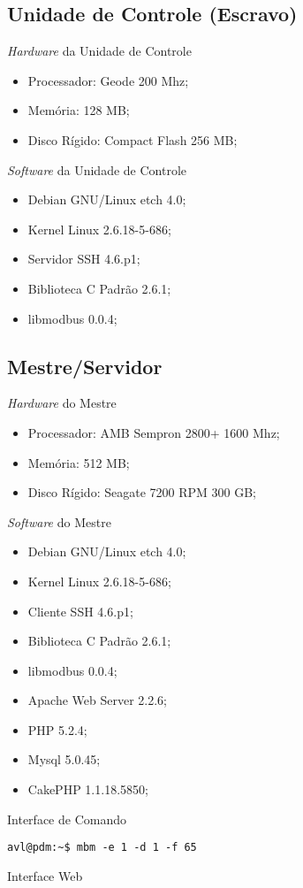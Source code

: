 \subsection{Unidade de Controle (Escravo)}
\begin{frame}{\textit{Hardware} da Unidade de Controle}
\begin{itemize}
\item Processador: Geode 200 Mhz;
\item Memória: 128 MB;
\item Disco Rígido: Compact Flash 256 MB;
\end{itemize}
\end{frame}

\begin{frame}{\textit{Software} da Unidade de Controle}
\begin{itemize}
\item Debian GNU/Linux etch 4.0;
\item Kernel Linux 2.6.18-5-686;
\item Servidor SSH 4.6.p1;
\item Biblioteca C Padrão 2.6.1;
\item libmodbus 0.0.4;
\end{itemize}
\end{frame}

\subsection{Mestre/Servidor}
\begin{frame}{\textit{Hardware} do Mestre}
\begin{itemize}
\item Processador: AMB Sempron 2800+ 1600 Mhz;
\item Memória: 512 MB;
\item Disco Rígido: Seagate 7200 RPM 300 GB;
\end{itemize}
\end{frame}

\begin{frame}{\textit{Software} do Mestre}
\begin{itemize}
\item Debian GNU/Linux etch 4.0;
\item Kernel Linux 2.6.18-5-686;
\item Cliente SSH 4.6.p1;
\item Biblioteca C Padrão 2.6.1;
\item libmodbus 0.0.4;
\item Apache Web Server 2.2.6;
\item PHP 5.2.4;
\item Mysql 5.0.45;
\item CakePHP 1.1.18.5850;
\end{itemize}
\end{frame}

\begin{frame}{Interface de Comando}
\begin{center}
\texttt{avl@pdm:\~{}\$ mbm -e 1 -d 1 -f 65}
\end{center}
\end{frame}

\begin{frame}{Interface Web}
\end{frame}
